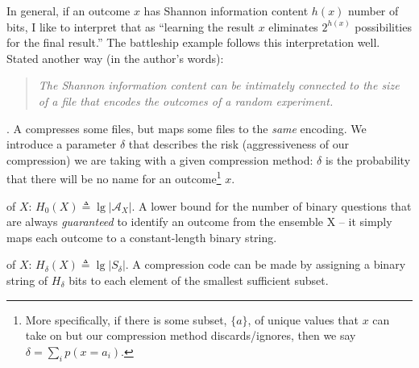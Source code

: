 \documentclass[11pt]{article}
\begin{document}
\p In general, if an outcome $x$ has Shannon information content $h(x)$ number of bits, I like to interpret that as ``learning the result $x$ eliminates $2^{h(x)}$ possibilities for the final result.'' The battleship example follows this interpretation well. Stated another way (in the author's words):
\begin{quote}
	{\itshape The Shannon information content can be intimately connected to the size of a file that encodes the outcomes of a random experiment.}
\end{quote}

\myspace
{}
\myspace

\p {}. A  compresses some files, but maps some files to the \textit{same} encoding. We introduce a parameter $\delta$ that describes the risk (aggressiveness of our compression) we are taking with a given compression method: $\delta$ is the probability that there will be no name for an outcome\footnote{More specifically, if there is some subset, $\{a\}$, of unique values that $x$ can take on but our compression method discards/ignores, then we say $\delta = \sum_i p(x = a_i)$.} $x$.


\begin{compactitem}
	\item {} of $X$: $H_0(X) \triangleq \lg |\mathcal{A}_X|$. A lower bound for the number of binary questions that are always \textit{guaranteed} to identify an outcome from the ensemble X -- it simply maps each outcome to a constant-length binary string.
	
	
	\item {} of $X$: $H_{\delta}(X) \triangleq \lg |S_{\delta} |$. A compression code can be made by assigning a binary string of $H_{\delta}$ bits to each element of the smallest sufficient subset. 
\end{compactitem}
\end{document}
